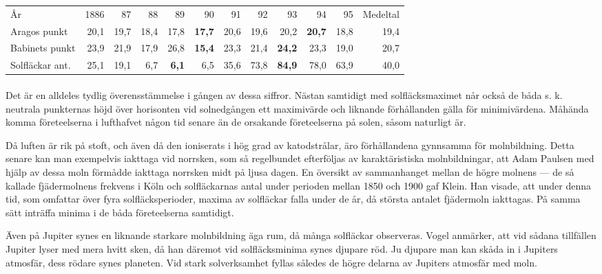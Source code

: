 \documentclass[a4paper, 12pt, oneside, swedish]{article}
\begin{document}
\begin{table}[H]
    \centering
    \footnotesize
    \begin{tabular}{p{10mm} r r r r r r r r r r r}
        År & 1886 & 87 & 88 & 89 & 90 & 91 & 92 & 93 & 94 & 95 & Medeltal   \\
        Aragos punkt & 20,1 & 19,7 & 18,4 & 17,8 & \textbf{17,7} & 20,6 & 19,6 & 20,2 & \textbf{20,7} & 18,8 & 19,4   \\
        Babinets punkt & 23,9 & 21,9 & 17,9 & 26,8 & \textbf{15,4} & 23,3 & 21,4 & \textbf{24,2} & 23,3 & 19,0 & 20,7   \\
        Solfläckar ant. & 25,1 & 19,1 & 6,7 & \textbf{6,1} & 6,5 & 35,6 & 73,8 & \textbf{84,9} & 78,0 & 63,9 & 40,0 \\
    \end{tabular}
\end{table}
\paragraph{}
Det är en alldeles tydlig överensstämmelse i gången av dessa siffror. Nästan samtidigt med solfläcksmaximet når också de båda s. k. neutrala punkternas höjd över horisonten vid solnedgången ett maximivärde och liknande förhållanden gälla för minimivärdena. Måhända komma företeelserna i lufthafvet någon tid senare än de orsakande företeelserna på solen, såsom naturligt är.

Då luften är rik på stoft, och även då den ioniserats i hög grad av katodstrålar, äro förhållandena gynnsamma för molnbildning. Detta senare kan man exempelvis iakttaga vid norrsken, som så regelbundet efterföljas av karaktäristiska molnbildningar, att Adam Paulsen med hjälp av dessa moln förmådde iakttaga norrsken midt på ljusa dagen. En översikt av sammanhanget mellan de högre molnens --- de så kallade fjädermolnens frekvens i Köln och solfläckarnas antal under perioden mellan 1850 och 1900 gaf Klein. Han visade, att under denna tid, som omfattar över fyra solfläcksperioder, maxima av solfläckar falla under de år, då största antalet fjädermoln iakttagas. På samma sätt inträffa minima i de båda företeelserna samtidigt.

Även på Jupiter synes en liknande starkare molnbildning äga rum, då många solfläckar observeras. Vogel anmärker, att vid sådana tillfällen Jupiter lyser med mera hvitt sken, då han däremot vid solfläcksminima synes djupare röd. Ju djupare man kan skåda in i Jupiters atmosfär, dess rödare synes planeten. Vid stark solverksamhet fyllas således de högre delarna av Jupiters atmosfär med moln.
\end{document}

